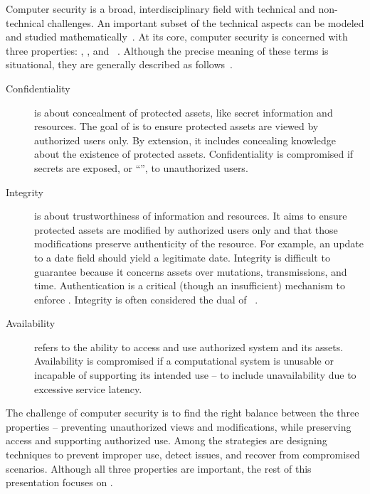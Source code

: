 Computer security is a broad, interdisciplinary field with technical and
non-technical challenges. An important subset of the technical aspects can be
modeled and studied mathematically~\cite{piessens2024}. At its core, computer
security is concerned with three properties: ,
, and ~\cite{du2019}. Although the precise
meaning of these terms is situational, they are generally described as
follows~\cite[p. 4--6]{bishop2003}.

\begin{description}
\item[Confidentiality]
is about concealment of protected assets, like secret information and resources.
The goal of  is to ensure protected assets are viewed by
authorized users only. By extension, it includes concealing knowledge about the
existence of protected assets. Confidentiality is compromised if secrets are
exposed, or \enquote{}, to unauthorized users.

\item[Integrity]
is about trustworthiness of information and resources. It aims to ensure
protected assets are modified by authorized users only and that those
modifications preserve authenticity of the resource. For example, an update to a
date field should yield a legitimate date. Integrity is difficult to guarantee
because it concerns assets over mutations, transmissions, and time.
Authentication is a critical (though an insufficient)
mechanism to enforce . Integrity is often considered the dual of
~\cite{biba1977}.

\item[Availability]
refers to the ability to access and use authorized system and its assets.
Availability is compromised if a computational system is unusable or incapable
of supporting its intended use -- to include unavailability due to excessive
service latency.

\end{description}
The challenge of computer security is to find the right balance between the
three properties -- preventing unauthorized views and modifications, while
preserving access and supporting authorized use. Among the strategies are
designing techniques to prevent improper use, detect issues, and recover from
compromised scenarios. Although all three properties are important, the rest of
this presentation focuses on .

